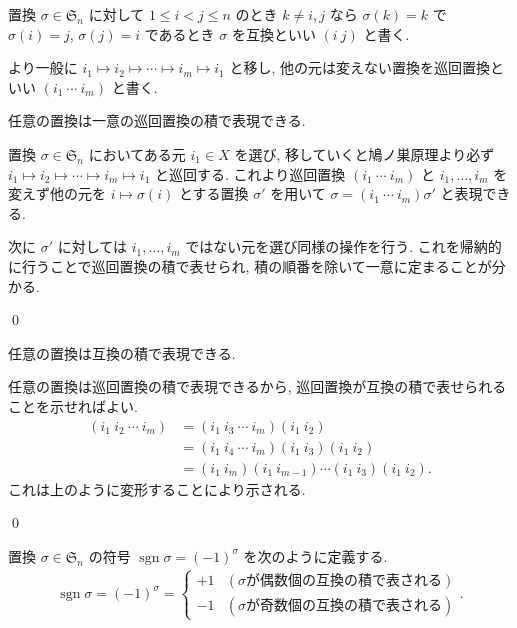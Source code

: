 \documentclass[uplatex,dvipdfmx,a4paper,11pt]{jlreq}
\makeatletter
\DeclareMathOperator{\sgn}{sgn}
\renewcommand{\SS}{\mathfrak{S}}
\numberwithin{equation}{section}
\theoremstyle{definition}
\renewenvironment{proof}[1][\proofname]{\par
  \normalfont
  \topsep6\p@\@plus6\p@ \trivlist
  \item[\hskip\labelsep{\bfseries #1}\@addpunct{\bfseries}]\ignorespaces\quad\par
}{
  \qed\endtrivlist\@endpefalse
}
\renewcommand\proofname{証明}
\makeatother
\begin{document}
\begin{definition}[互換, 巡回置換]
  置換 $\sigma\in\SS_n$ に対して $1\leq i < j\leq n$ のとき $k \neq i,j$ なら $\sigma(k) = k$ で $\sigma(i) = j$, $\sigma(j) = i$ であるとき $\sigma$ を互換といい $(i\ j)$ と書く.

  より一般に $i_1\mapsto i_2\mapsto\cdots\mapsto i_m\mapsto i_1$ と移し, 他の元は変えない置換を巡回置換といい $(i_1\ \cdots\ i_m)$ と書く.
\end{definition}

\begin{lemma}
  任意の置換は一意の巡回置換の積で表現できる.
\end{lemma}
\begin{proof}
  置換 $\sigma\in\SS_n$ においてある元 $i_1\in X$ を選び, 移していくと鳩ノ巣原理より必ず $i_1\mapsto i_2\mapsto\cdots\mapsto i_m\mapsto i_1$ と巡回する. これより巡回置換 $(i_1\ \cdots\ i_m)$ と $i_1,\ldots,i_m$ を変えず他の元を $i\mapsto\sigma(i)$ とする置換 $\sigma'$ を用いて $\sigma = (i_1\ \cdots\ i_m)\sigma'$ と表現できる.

  次に $\sigma'$ に対しては $i_1,\ldots,i_m$ ではない元を選び同様の操作を行う. これを帰納的に行うことで巡回置換の積で表せられ, 積の順番を除いて一意に定まることが分かる.
\end{proof}

\begin{theorem}[Q21-7(i)]
  任意の置換は互換の積で表現できる.
\end{theorem}
\begin{proof}
  任意の置換は巡回置換の積で表現できるから, 巡回置換が互換の積で表せられることを示せればよい.
  \begin{align}
    (i_1\ i_2\ \cdots\ i_m) & = (i_1\ i_3\ \cdots\ i_m)(i_1\ i_2)                   \\
                            & = (i_1\ i_4\ \cdots\ i_m)(i_1\ i_3)(i_1\ i_2)         \\
                            & = (i_1\ i_m)(i_1\ i_{m-1})\cdots(i_1\ i_3)(i_1\ i_2).
  \end{align}
  これは上のように変形することにより示される.
\end{proof}

\begin{definition}[符号]
  置換 $\sigma\in\SS_n$ の符号 $\sgn\sigma = (-1)^\sigma$ を次のように定義する.
  \begin{align}
    \sgn\sigma = (-1)^\sigma = \begin{cases}
                                 +1 & (\sigma が偶数個の互換の積で表される) \\
                                 -1 & (\sigma が奇数個の互換の積で表される)
                               \end{cases}.
  \end{align}
\end{definition}
\end{document}
